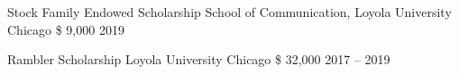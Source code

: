 \begin{cvhonors}
    \cvhonor
    {Stock Family Endowed Scholarship} %
    {School of Communication, Loyola University Chicago} %
    {\$ 9,000} %
    {2019} %


    \cvhonor
    {Rambler Scholarship} %
    { Loyola University Chicago} %
    {\$ 32,000} %
    {2017 -- 2019} %
\end{cvhonors}






    



  